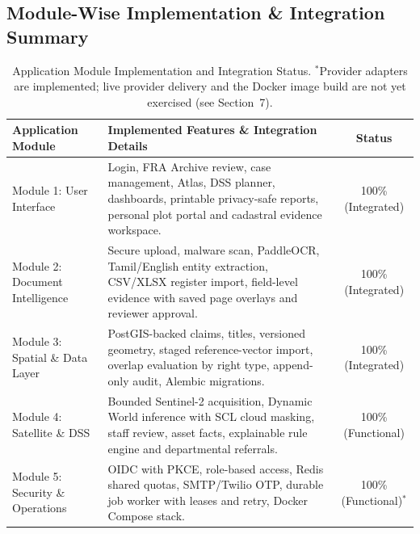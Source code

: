 \documentclass[11pt, a4paper]{article}
\begin{document}
\subsection{Module-Wise Implementation \& Integration Summary}
\begin{table}[H]
    \centering
    \footnotesize
    \renewcommand{\arraystretch}{1.25}
    \begin{tabular}{|p{3.5cm}|p{7.8cm}|c|}
        \hline
        \textbf{Application Module} & \textbf{Implemented Features \& Integration Details} & \textbf{Status} \\
        \hline
        Module 1: User Interface & Login, FRA Archive review, case management, Atlas, DSS planner, dashboards, printable privacy-safe reports, personal plot portal and cadastral evidence workspace. & 100\% (Integrated) \\
        \hline
        Module 2: Document Intelligence & Secure upload, malware scan, PaddleOCR, Tamil/English entity extraction, CSV/XLSX register import, field-level evidence with saved page overlays and reviewer approval. & 100\% (Integrated) \\
        \hline
        Module 3: Spatial \& Data Layer & PostGIS-backed claims, titles, versioned geometry, staged reference-vector import, overlap evaluation by right type, append-only audit, Alembic migrations. & 100\% (Integrated) \\
        \hline
        Module 4: Satellite \& DSS & Bounded Sentinel-2 acquisition, Dynamic World inference with SCL cloud masking, staff review, asset facts, explainable rule engine and departmental referrals. & 100\% (Functional) \\
        \hline
        Module 5: Security \& Operations & OIDC with PKCE, role-based access, Redis shared quotas, SMTP/Twilio OTP, durable job worker with leases and retry, Docker Compose stack. & 100\% (Functional)$^{*}$ \\
        \hline
    \end{tabular}
    \caption{Application Module Implementation and Integration Status. $^{*}$Provider adapters are implemented; live provider delivery and the Docker image build are not yet exercised (see Section~7).}
\end{table}
\end{document}
